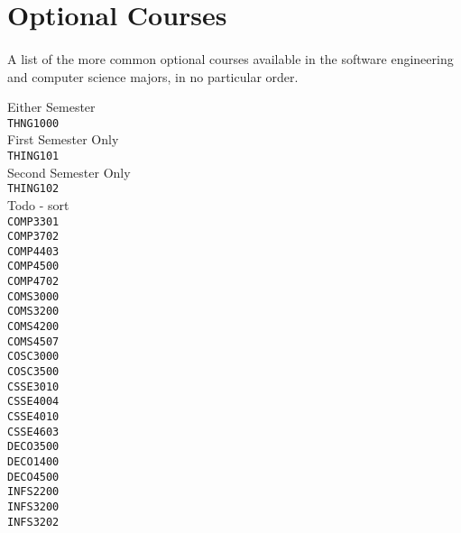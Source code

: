 \section{Optional Courses}

\paragraph{} A list of the more common optional courses available in the software engineering and computer science majors, in no particular order.

\begin{center}
Either Semester \\
\texttt{THNG1000} \\
First Semester Only \\
\texttt{THING101} \\
Second Semester Only \\
\texttt{THING102} \\
Todo - sort \\
\texttt{COMP3301} \\
\texttt{COMP3702} \\
\texttt{COMP4403} \\
\texttt{COMP4500} \\
\texttt{COMP4702} \\
\texttt{COMS3000} \\
\texttt{COMS3200} \\
\texttt{COMS4200} \\
\texttt{COMS4507} \\
\texttt{COSC3000} \\
\texttt{COSC3500} \\
\texttt{CSSE3010} \\
\texttt{CSSE4004} \\
\texttt{CSSE4010} \\
\texttt{CSSE4603} \\
\texttt{DECO3500} \\
\texttt{DECO1400} \\
\texttt{DECO4500} \\
\texttt{INFS2200} \\
\texttt{INFS3200} \\
\texttt{INFS3202} \\
\end{center}
